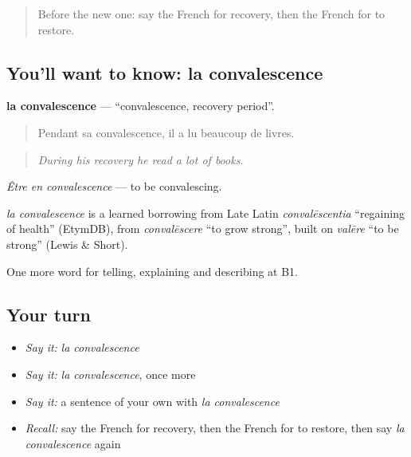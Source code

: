 \label{lesson:FR-C485-convalescence}



\begin{quote}
Before the new one: say the French for recovery, then the French for to restore.
\end{quote}

\subsection*{You'll want to know: la convalescence}
\textbf{la convalescence} — \textquotedblleft{}convalescence, recovery period\textquotedblright{}.

\begin{quote}
Pendant sa convalescence, il a lu beaucoup de livres.
\end{quote}

\begin{quote}
\emph{During his recovery he read a lot of books.}
\end{quote}

\emph{Être en convalescence} — to be convalescing.

\begin{cousinweb}
\emph{la convalescence} is a learned borrowing from Late Latin \emph{convalēscentia} \textquotedblleft{}regaining of health\textquotedblright{} (EtymDB), from \emph{convalēscere} \textquotedblleft{}to grow strong\textquotedblright{}, built on \emph{valēre} \textquotedblleft{}to be strong\textquotedblright{} (Lewis \& Short).
\end{cousinweb}

\begin{grammarlens}[title={What you've built}]
One more word for telling, explaining and describing at B1.
\end{grammarlens}

\subsection*{Your turn}
\begin{itemize}
\raggedright
  \item \emph{Say it:} \emph{la convalescence}
  \item \emph{Say it:} \emph{la convalescence}, once more
  \item \emph{Say it:} a sentence of your own with \emph{la convalescence}
  \item \emph{Recall:} say the French for recovery, then the French for to restore, then say \emph{la convalescence} again
\end{itemize}

